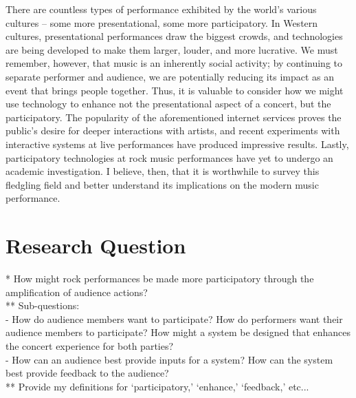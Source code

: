 There are countless types of performance exhibited by the world's various cultures -- some more presentational, some more participatory. In Western cultures, presentational performances draw the biggest crowds, and technologies are being developed to make them larger, louder, and more lucrative. We must remember, however, that music is an inherently social activity; by continuing to separate performer and audience, we are potentially reducing its impact as an event that brings people together. Thus, it is valuable to consider how we might use technology to enhance not the presentational aspect of a concert, but the participatory. The popularity of the aforementioned internet services proves the public's desire for deeper interactions with artists, and recent experiments with interactive systems at live performances have produced impressive results. Lastly, participatory technologies at rock music performances have yet to undergo an academic investigation. I believe, then, that it is worthwhile to survey this fledgling field and better understand its implications on the modern music performance.


\section{Research Question}

* How might rock performances be made more participatory through the amplification of audience actions?\\
** Sub-questions:\\
- How do audience members want to participate? How do performers want their audience members to participate? How might a system be designed that enhances the concert experience for both parties?\\
- How can an audience best provide inputs for a system? How can the system best provide feedback to the audience?\\
** Provide my definitions for `participatory,' `enhance,' `feedback,' etc...\\

